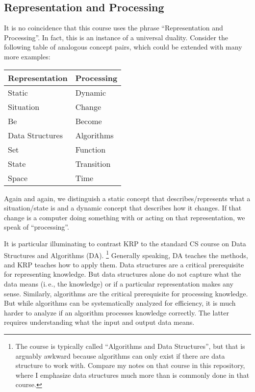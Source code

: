 \subsection{Representation and Processing}

It is no coincidence that this course uses the phrase \enquote{Representation and Processing}.
In fact, this is an instance of a universal duality.
Consider the following table of analogous concept pairs, which could be extended with many more examples:

\begin{center}
\begin{tabular}{ll}
\toprule
Representation & Processing \\
\midrule
Static & Dynamic \\
Situation & Change \\
Be & Become \\
Data Structures & Algorithms \\
Set & Function \\
State & Transition \\
Space & Time \\
\bottomrule
\end{tabular}
\end{center}

Again and again, we distinguish a static concept that describes/represents what a situation/state is and a dynamic concept that describes how it changes.
If that change is a computer doing something with or acting on that representation, we speak of \enquote{processing}.

It is particular illuminating to contrast KRP to the standard CS course on Data Structures and Algorithms (DA).%
\footnote{The course is typically called \enquote{Algorithms and Data Structures}, but that is arguably awkward because algorithms can only exist if there are data structure to work with. Compare my notes on that course in this repository, where I emphasize data structures much more than is commonly done in that course.}
Generally speaking, DA teaches the methods, and KRP teaches how to apply them.
Data structures are a critical prerequisite for representing knowledge.
But data structures alone do not capture what the data means (i.\,e., the knowledge) or if a particular representation makes any sense.
Similarly, algorithms are the critical prerequisite for processing knowledge.
But while algorithms can be systematically analyzed for efficiency, it is much harder to analyze if an algorithm processes knowledge correctly.
The latter requires understanding what the input and output data means.

